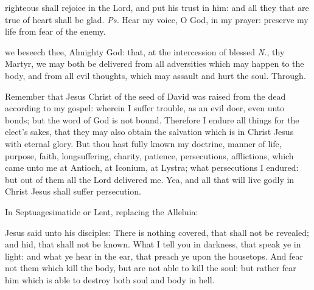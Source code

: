 \introit
{} righteous shall rejoice in the Lord, and put his trust in him: and all they that are true of heart shall be glad. \textit{Ps.} Hear my voice, O God, in my prayer: preserve my life from fear of the enemy.

\collect
{} we beseech thee, Almighty God: that, at the intercession of blessed \textit{N.}, thy Martyr, we may both be delivered from all adversities which may happen to the body, and from all evil thoughts, which may assault and hurt the soul. Through.

\label{2Timothy28}\label{CommonMartyrNotBishopIIEpistle}
 Remember that Jesus Christ of the seed of David was raised from the dead according to my gospel: wherein I suffer trouble, as an evil doer, even unto bonds; but the word of God is not bound. Therefore I endure all things for the elect's sakes, that they may also obtain the salvation which is in Christ Jesus with eternal glory. But thou hast fully known my doctrine, manner of life, purpose, faith, longsuffering, charity, patience, persecutions, afflictions, which came unto me at Antioch, at Iconium, at Lystra; what persecutions I endured: but out of them all the Lord delivered me. Yea, and all that will live godly in Christ Jesus shall suffer persecution.


\clearpage
\begin{rubric}
{In Septuagesimatide or Lent, replacing the Alleluia:}
\end{rubric}

\vspace{-1ex}


\label{CommonMartyrNotBishopIIGospel}
 Jesus said unto his disciples: There is nothing covered, that shall not be revealed; and hid, that shall not be known. What I tell you in darkness, that speak ye in light: and what ye hear in the ear, that preach ye upon the housetops. And fear not them which kill the body, but are not able to kill the soul: but rather fear him which is able to destroy both soul and body in hell.

